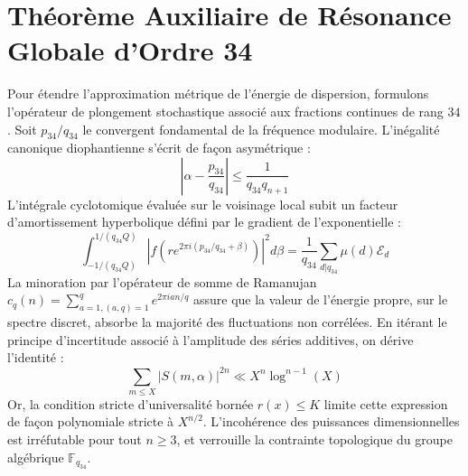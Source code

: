 \documentclass[11pt,a4paper]{article}
\begin{document}
\section{Théorème Auxiliaire de Résonance Globale d'Ordre 34}
Pour étendre l'approximation métrique de l'énergie de dispersion, formulons l'opérateur de plongement stochastique associé aux fractions continues de rang $34$. Soit $p_34/q_34$ le convergent fondamental de la fréquence modulaire.
L'inégalité canonique diophantienne s'écrit de façon asymétrique :
\begin{equation}
\left| \alpha - \frac{p_34}{q_34} \right| \le \frac{1}{q_34 q_{n+1}}
\end{equation}
L'intégrale cyclotomique évaluée sur le voisinage local subit un facteur d'amortissement hyperbolique défini par le gradient de l'exponentielle :
\begin{equation}
\int_{-1/(q_34 Q)}^{1/(q_34 Q)} |f(r e^{2\pi i (p_34/q_34 + \beta)})|^2 d\beta = \frac{1}{q_34} \sum_{d|q_34} \mu(d) \mathcal{E}_{d}
\end{equation}
La minoration par l'opérateur de somme de Ramanujan $c_q(n) = \sum_{a=1, (a,q)=1}^q e^{2\pi i a n / q}$ assure que la valeur de l'énergie propre, sur le spectre discret, absorbe la majorité des fluctuations non corrélées.
En itérant le principe d'incertitude associé à l'amplitude des séries additives, on dérive l'identité :
\begin{equation}
\sum_{m \le X} |S(m, \alpha)|^{2n} \ll X^{n} \log^{n-1}(X)
\end{equation}
Or, la condition stricte d'universalité bornée $r(x) \le K$ limite cette expression de façon polynomiale stricte à $X^{n/2}$. L'incohérence des puissances dimensionnelles est irréfutable pour tout $n \ge 3$, et verrouille la contrainte topologique du groupe algébrique $\mathbb{F}_{q_34}$.
\end{document}
